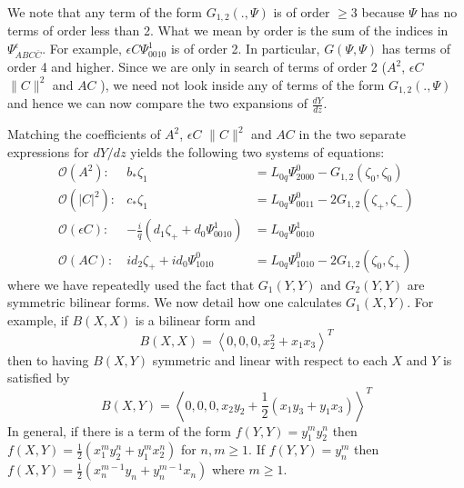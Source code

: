 We note that any term of the form $G_{1,2}\left( . , \Psi\right)$ is of order $\ge 3$ because $\Psi$ has no terms of order
less than 2. What we mean by order is the sum of the indices in $\Psi_{ABC\bar{C}}^\epsilon$. For example, $ \epsilon C \Psi_{0010}^1$ is of order 2. In particular, $G(\Psi, \Psi)$ has terms of order 4 and higher. Since we are only in search of
terms of order 2 ($A^2$, $\epsilon C$ $\|C\|^2$ and $AC$ ), we need not look inside any of terms of the form $G_{1,2}\left( . , \Psi\right)$  and hence we can now compare the two expansions of $\frac{dY}{dz}$.

Matching the coefficients of  $A^2$, $\epsilon C$ $\|C\|^2$ and
$AC$ in the two separate expressions for $dY/dz$ yields the
following two systems of equations:
\begin{subequations}
\begin{eqnarray}
\mathcal{O}(A^2): &		b_* \zeta_1 &= L_{0q} \Psi_{2000}^0 - G_{1,2}(\zeta_0,\zeta_0) \\
\mathcal{O}(\left|C\right|^2):&	c_* \zeta_1 &= L_{0q} \Psi_{0011}^0 -2 G_{1,2}(\zeta_+,\zeta_-) \label{eq:cstar} \\
\mathcal{O}(\epsilon C): &-\frac{i}{q} \left(d_1 \zeta_+ +  d_0 \Psi_{0010}^1\right) &= L_{0q} \Psi_{0010}^1 \\
\mathcal{O}(A C): 	&i d_2 \zeta_+ + i d_0 \Psi_{1010}^0 &= L_{0q} \Psi_{1010}^0 - 2 G_{1,2}(\zeta_0,\zeta_+)  \label{eq:AC}
\end{eqnarray}
\end{subequations}
where we have repeatedly used the fact that $G_1(Y,Y)$ and $G_2(Y,Y)$ are symmetric bilinear forms. 
We now detail how one calculates $G_1(X,Y)$. For example, if $B(X,X)$ is a bilinear form and 
\begin{equation*}
B(X,X)= \left<0,0,0, x_2^2 + x_1 x_3 \right>^T
\end{equation*}
then to having $B(X,Y)$ symmetric and linear with respect to each $X$ and $Y$ is 
satisfied by
\begin{equation*}
B(X,Y)= \left<0,0,0, x_2 y_2 + \frac{1}{2}\left(x_1 y_3 + y_1 x_3 \right)\right>^T
\end{equation*}
In general, if there is a term of the form $f(Y,Y)=y_1^m y_2^n$ then $f(X,Y)=\frac{1}{2}\left(x_1^m y_2^n + y_1^m x_2^n\right)$
for $n,m\ge 1$. If $f(Y,Y) = y_n^m$ then $f(X,Y) = \frac{1}{2}\left( x_n^{m-1} y_n + y_n^{m-1} x_n \right) $ where $m\ge1$.

